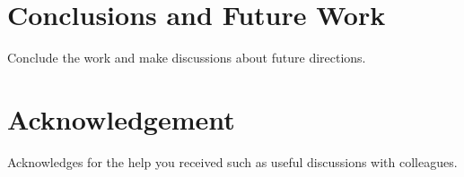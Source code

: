 \documentclass[sigconf]{acmart}
\begin{document}
\section{Conclusions and Future Work}\label{sec:conclusions}
Conclude the work and make discussions about future directions.

\section*{Acknowledgement}
Acknowledges for the help you received such as useful discussions with colleagues.


\balance

\end{document}
